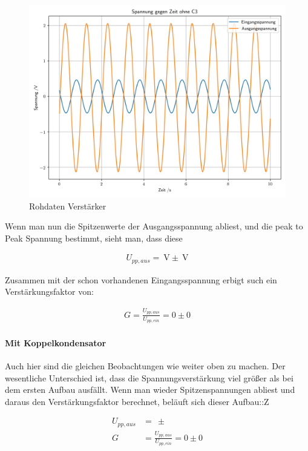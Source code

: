 \documentclass[12pt,twoside,a4paper]{scrartcl}
\begin{document}
				\begin{figure}
					\centering
					\includegraphics{Plots/amp/SpannungGegZeitohne C3}
					\caption{Rohdaten Verstärker}
					\label{}
				\end{figure}

				Wenn man nun die Spitzenwerte der Ausgangsspannung abliest, und die peak to Peak Spannung bestimmt, sieht man, dass diese

				\begin{align*}
					U_{pp,aus} = \SI{}{\volt} \pm \SI{}{\volt}
				\end{align*}

				Zusammen mit der schon vorhandenen Eingangsspannung erbigt such ein Verstärkungsfaktor von:

				\begin{align}
					G = \frac{U_{pp,aus}}{U_{pp,ein}} = 0 \pm 0
				\end{align}

			\paragraph{Mit Koppelkondensator}

				Auch hier sind die gleichen Beobachtungen wie weiter oben zu machen. Der wesentliche Unterschied ist, dass die Spannungsverstärkung viel größer als bei dem ersten Aufbau ausfällt. Wenn man wieder Spitzenspannungen abliest und daraus den Verstärkungsfaktor berechnet, beläuft sich dieser Aufbau::Z

				\begin{align}
					U_{pp,aus} &= \SI{}{} \pm \SI{}{} \\
					G &= \frac{U_{pp,aus}}{U_{pp,ein}} = 0 \pm 0
				\end{align}
\end{document}

